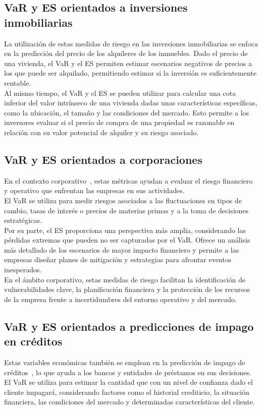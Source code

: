 \documentclass[11pt]{book}
\theoremstyle{plain} %
\theoremstyle{definition} %
\begin{document}
\subsection{VaR y ES orientados a inversiones inmobiliarias}
La utilización de estas medidas de riesgo en las inversiones inmobiliarias 
se enfoca en la predicción del precio de los alquileres de los inmuebles. 
Dado el precio de una vivienda, el VaR y el ES permiten estimar escenarios negativos 
de precios a los que puede ser alquilado, permitiendo estimar 
si la inversión es suficientemente rentable.\\

Al mismo tiempo, el VaR y el ES se pueden utilizar para calcular una 
cota inferior del valor intrínseco de una vivienda dadas unas características
específicas, como la ubicación, el tamaño y las condiciones del mercado.
Esto permite a los inversores evaluar si el precio de compra de una propiedad
es razonable en relación con su valor potencial de alquiler y su riesgo asociado.\\


\subsection{VaR y ES orientados a corporaciones}
En el contexto corporativo~\cite{OBU17}, estas métricas ayudan a evaluar el riesgo 
financiero y operativo que enfrentan las empresas en sus actividades.\\

El VaR se utiliza para medir riesgos asociados a las fluctuaciones en tipos de 
cambio, tasas de interés o precios de materias primas y a la toma de 
decisiones estratégicas.\\

Por su parte, el ES proporciona una perspectiva más amplia, considerando 
las pérdidas extremas que pueden no ser capturadas por el VaR. Ofrece un 
análisis más detallado de los escenarios de mayor impacto financiero y 
permite a las empresas diseñar planes de mitigación y estrategias para 
afrontar eventos inesperados.\\

En el ámbito corporativo, estas medidas de riesgo facilitan la identificación 
de vulnerabilidades clave, la planificación financiera y la protección de los 
recursos de la empresa frente a incertidumbres del entorno operativo y del 
mercado.

\subsection{VaR y ES orientados a predicciones de impago en créditos}
Estas variables económicas también se emplean en la predicción de impago 
de créditos~\cite{KO17}, lo que ayuda a los bancos y entidades de préstamos en sus 
decisiones.
El VaR se utiliza para estimar la cantidad que con un nivel de confianza dado 
el cliente impagará, considerando factores como el historial crediticio, la 
situación financiera, las condiciones del mercado y determinadas 
características del cliente. \\
\end{document}
